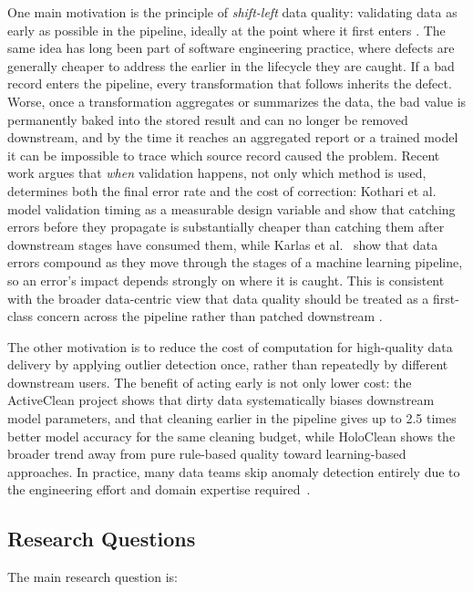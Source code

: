 \documentclass[12pt]{article}
\begin{document}
One main motivation is the principle of \emph{shift-left} data quality: validating data as early as possible in the pipeline, ideally at the point where it first enters \cite{datakitchen2023shiftleft}. The same idea has long been part of software engineering practice, where defects are generally cheaper to address the earlier in the lifecycle they are caught. If a bad record enters the pipeline, every transformation that follows inherits the defect. Worse, once a transformation aggregates or summarizes the data, the bad value is permanently baked into the stored result and can no longer be removed downstream, and by the time it reaches an aggregated report or a trained model it can be impossible to trace which source record caused the problem. Recent work argues that \emph{when} validation happens, not only which method is used, determines both the final error rate and the cost of correction: Kothari et al.\ \cite{kothari2026earlyqa} model validation timing as a measurable design variable and show that catching errors before they propagate is substantially cheaper than catching them after downstream stages have consumed them, while Karlas et al.\ \cite{karlas2025navigating} show that data errors compound as they move through the stages of a machine learning pipeline, so an error's impact depends strongly on where it is caught. This is consistent with the broader data-centric view that data quality should be treated as a first-class concern across the pipeline rather than patched downstream \cite{whang2023datacentric}.

The other motivation is to reduce the cost of computation for high-quality data delivery by applying outlier detection once, rather than repeatedly by different downstream users. The benefit of acting early is not only lower cost: the ActiveClean project \cite{krishnan2016activeclean} shows that dirty data systematically biases downstream model parameters, and that cleaning earlier in the pipeline gives up to 2.5 times better model accuracy for the same cleaning budget, while HoloClean \cite{rekatsinas2017holoclean} shows the broader trend away from pure rule-based quality toward learning-based approaches. In practice, many data teams skip anomaly detection entirely due to the engineering effort and domain expertise required~\cite{tu2023autovalidate}.
\subsection{Research Questions}

The main research question is:
\end{document}
